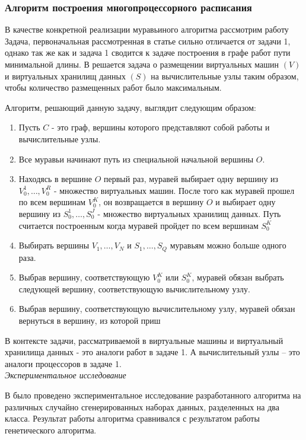 \documentclass{article}
\begin{document}
\subsubsection{Алгоритм построения многопроцессорного расписания}
\par В качестве конкретной реализации муравьиного алгоритма рассмотрим работу \cite{Kostenko_Plakunov_2017} Задача, первоначальная рассмотренная в статье сильно отличается от задачи 1, однако так же как и задача 1 сводится к задаче построения в графе работ пути минимальной длины. В \cite{Kostenko_Plakunov_2017} решается задача о размещении виртуальных машин $(V)$ и виртуальных хранилищ данных $(S)$ на вычислительные узлы таким образом, чтобы количество размещенных работ было максимальным.
\par Алгоритм, решающий данную задачу, выглядит следующим образом:
\begin{enumerate}
  \item Пусть $C$ - это граф, вершины которого представляют собой работы и вычислительные узлы.
  \item Все муравьи начинают путь из специальной начальной вершины $O$.
  \item Находясь в вершине $O$ первый раз, муравей выбирает одну вершину из $V_0^1,\dots ,V_0^R$ - множество виртуальных машин. После того как муравей прошел по всем вершинам $V_0^K$, он возвращается в вершину $O$ и выбирает одну вершину из $S_0^1,\dots , S_0^J$ - множество виртуальных хранилищ данных. Путь считается построенным когда муравей пройдет по всем вершинам $S_0^K$
  \item Выбирать вершины $V_1, \dots , V_N$ и $S_1, \dots , S_Q$ муравьям можно больше одного раза.
  \item Выбрав вершину, соответствующую $V_0^K$ или $S_0^K$, муравей обязан выбрать следующей вершину, соответствующую вычислительному узлу.
  \item Выбрав вершину, соответствующую вычислительному узлу, муравей обязан вернуться в вершину, из которой приш
\end{enumerate}
\par В контексте задачи, рассматриваемой в \cite{Kostenko_Plakunov_2017} виртуальные машины и виртуальный хранилища данных - это аналоги работ в задаче 1. А вычислительный узлы – это аналоги процессоров в задаче 1. \\
\textit{Экспериментальное исследование}
\par В \cite{Kostenko_Plakunov_2017} было проведено экспериментальное исследование  разработанного алгоритма на различных случайно сгенерированных наборах данных, разделенных на два класса. Результат работы алгоритма сравнивался с результатом работы генетического алгоритма.
\end{document}
